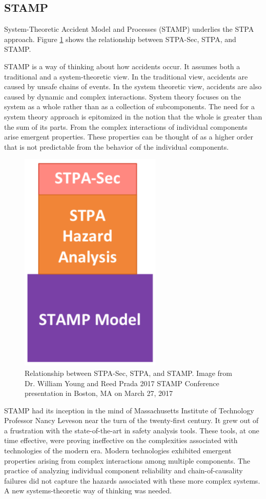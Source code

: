 \documentclass[../../main/main.tex]{subfiles}
\begin{document}
\subsection{STAMP}\label{ssec:stamp}
System-Theoretic Accident Model and Processes (STAMP) underlies the STPA approach.  Figure \ref{stampstpa} shows the relationship between STPA-Sec, STPA, and STAMP.


STAMP is a way of thinking about how accidents occur.  It assumes both a traditional and a system-theoretic view.  In the traditional view, accidents are caused by unsafe chains of events.  In the system theoretic view, accidents are also caused by dynamic and complex interactions. System theory focuses on the system as a whole rather than as a collection of subcomponents.  The need for a system theory approach is epitomized in the notion that the whole is greater than the sum of its parts.  From the complex interactions of individual components arise emergent properties. These properties can be thought of as a higher order that is not predictable from the behavior of the individual components.





\begin{figure}[h!]
\centering
\includegraphics[width=0.3\linewidth]{../figures/stampstpa}
\caption{\label{stampstpa}Relationship between STPA-Sec, STPA, and STAMP.  Image from Dr. William Young and Reed Prada 2017 STAMP Conference presentation in Boston, MA on March 27, 2017 \cite{youngPorada} }
\end{figure}

STAMP had its inception in the mind of Massachusetts Institute of Technology Professor Nancy Leveson near the turn of the twenty-first century. It grew out of a frustration with the state-of-the-art in safety analysis tools.  These tools, at one time effective, were proving ineffective on the complexities associated with technologies of the modern era.  Modern technologies exhibited emergent properties arising from complex interactions among multiple components.  The practice of analyzing individual component reliability and chain-of-causality failures did not capture the hazards associated with these more complex systems.  A new systems-theoretic way of thinking was needed.  
\end{document}
